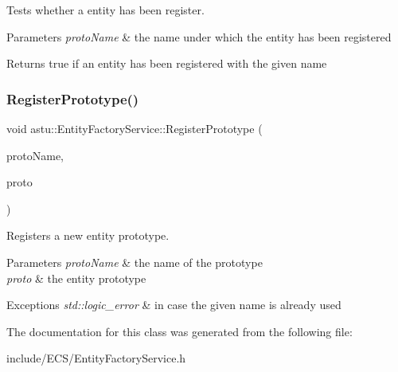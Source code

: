 Tests whether a entity has been register.


\begin{DoxyParams}{Parameters}
{\em proto\+Name} & the name under which the entity has been registered \\
\hline
\end{DoxyParams}
\begin{DoxyReturn}{Returns}
{\ttfamily true} if an entity has been registered with the given name 
\end{DoxyReturn}
\mbox{\label{classastu_1_1EntityFactoryService_ade1d8c60a6982c409501e58dcd8c2bc8}} 
\subsubsection{\texorpdfstring{Register\+Prototype()}{RegisterPrototype()}}
{\footnotesize\ttfamily void astu\+::\+Entity\+Factory\+Service\+::\+Register\+Prototype (\begin{DoxyParamCaption}\item[{const std\+::string \&}]{proto\+Name,  }\item[{std\+::shared\+\_\+ptr$<$ \hyperlink{classastu_1_1Entity}{Entity} $>$}]{proto }\end{DoxyParamCaption})}

Registers a new entity prototype.


\begin{DoxyParams}{Parameters}
{\em proto\+Name} & the name of the prototype \\
\hline
{\em proto} & the entity prototype \\
\hline
\end{DoxyParams}

\begin{DoxyExceptions}{Exceptions}
{\em std\+::logic\+\_\+error} & in case the given name is already used \\
\hline
\end{DoxyExceptions}


The documentation for this class was generated from the following file\+:\begin{DoxyCompactItemize}
\item 
include/\+E\+C\+S/Entity\+Factory\+Service.\+h\end{DoxyCompactItemize}
